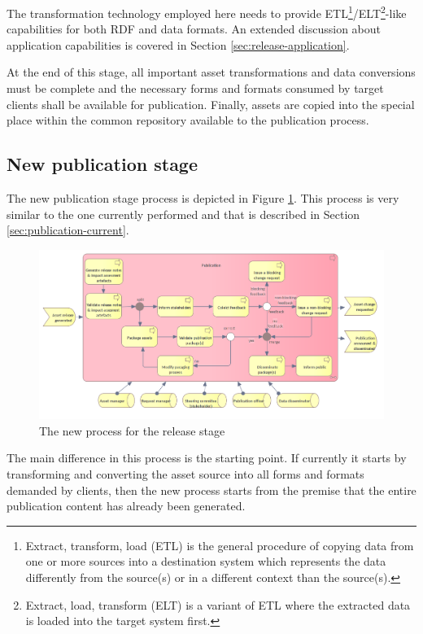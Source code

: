 	The transformation technology employed here needs to provide ETL\footnote{Extract, transform, load (ETL) is the general procedure of copying data from one or more sources into a destination system which represents the data differently from the source(s) or in a different context than the source(s).}/ELT\footnote{Extract, load, transform (ELT) is a variant of ETL where the extracted data is loaded into the target system first.}-like capabilities for both RDF and data formats. An extended discussion about application capabilities is covered in Section \ref{sec:release-application}.
	
	At the end of this stage, all important asset transformations and data conversions must be complete and the necessary forms and formats consumed by target clients shall be available for publication. Finally, assets are copied into the special place within the common repository available to the publication process. 
	
	\subsection{New publication stage}
	\label{sec:publication-new}
	
	The new publication stage process is depicted in Figure \ref{fig:publication-new}. This process is very similar to the one currently performed and that is described in Section \ref{sec:publication-current}.
	
	\begin{figure}[h]
		\centering
		\includegraphics[width=1.05\textwidth]{images/business/new/Publication.png}
		\caption{The new process for the release stage}
		\label{fig:publication-new}
	\end{figure}

	The main difference in this process is the starting point. If currently it starts by transforming and converting the asset source into all forms and formats demanded by clients, then the new process starts from the premise that the entire publication content has already been generated. 
	
